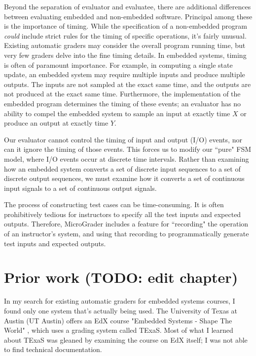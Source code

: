 \documentclass[12pt]{article}
\begin{document}
Beyond the separation of evaluator and evaluatee, there are additional differences between evaluating embedded and non-embedded software.  Principal among these is the importance of timing.  While the specification of a non-embedded program \textit{could} include strict rules for the timing of specific operations, it's fairly unusual.  Existing automatic graders may consider the overall program running time, but very few graders delve into the fine timing details. In embedded systems, timing is often of paramount importance.  For example, in computing a single state update, an embedded system may require multiple inputs and produce multiple outputs.  The inputs are not sampled at the exact same time, and the outputs are not produced at the exact same time.  Furthermore, the implementation of the embedded program determines the timing of these events; an evaluator has no ability to compel the embedded system to sample an input at exactly time $X$ or produce an output at exactly time $Y$.

Our evaluator cannot control the timing of input and output (I/O) events, nor can it ignore the timing of those events.  This forces us to modify our ``pure" FSM model, where I/O events occur at discrete time intervals.  Rather than examining how an embedded system converts a set of discrete input sequences to a set of discrete output sequences, we must examine how it converts a set of continuous input signals to a set of continuous output signals.

The process of constructing test cases can be time-consuming.  It is often prohibitively tedious for instructors to specify all the test inputs and expected outputs.  Therefore, MicroGrader includes a feature for ``recording" the operation of an instructor's system, and using that recording to programmatically generate test inputs and expected outputs. 


\newpage
\section{Prior work (TODO: edit chapter)}
In my search for existing automatic graders for embedded systems courses, I found only one system that's actually being used.  The University of Texas at Austin (UT Austin) offers an EdX course "Embedded Systems - Shape The World" \cite{ut-austin-edx}, which uses a grading system called TExaS.  Most of what I learned about TExaS was gleaned by examining the course on EdX itself; I was not able to find technical documentation.
\end{document}
